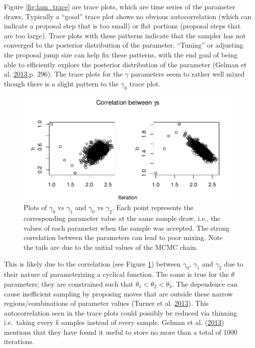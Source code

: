 \documentclass[11pt,a4paper]{article}
\numberwithin{equation}{section}
\begin{document}
Figure \ref{fig:lam_trace} are trace plots, which are time series of the
parameter draws. Typically a ``good'' trace plot shows no obvious
autocorrelation (which can indicate a proposal step that is too small)
or flat portions (proposal steps that are too large). Trace plots with
these patterns indicate that the sampler has not converged to the
posterior distribution of the parameter. ``Tuning'' or adjusting the
proposal jump size can help fix these patterns, with the end goal of
being able to efficiently explore the posterior distribution of the
parameter (Gelman et al.
\protect\hyperlink{ref-gelman_bayesian_2013}{2013},p. 296). The trace
plots for the \(\gamma\) parameters seem to rather well mixed though
there is a slight pattern to the \(\gamma_0\) trace plot.

\begin{figure}
\centering
\includegraphics{thesis_draft_files/figure-latex/unnamed-chunk-2-1.pdf}
\caption{\label{fig:cor_gammas}Plots of \(\gamma_0\) vs \(\gamma_1\) and
\(\gamma_0\) vs \(\gamma_2\). Each point represents the corresponding
parameter value at the same sample draw, i.e., the values of each
parameter when the sample was accepted. The strong correlation between
the parameters can lead to poor mixing. Note the tails are due to the
initial values of the MCMC chain.}
\end{figure}

This is likely due to the correlation (see Figure \ref{fig:cor_gammas})
between \(\gamma_0\), \(\gamma_1\) and \(\gamma_2\) due to their nature
of parameterizing a cyclical function. The same is true for the
\(\theta\) parameters; they are constrained such that
\(\theta_1 < \theta_2 < \theta_3\). The dependence can cause inefficient
sampling by proposing moves that are outside these narrow
regions/combinations of parameter values (Turner et al.
\protect\hyperlink{ref-turner_method_2013}{2013}). This autocorrelation
seen in the trace plots could possibly be reduced via thinning
i.e.~taking every \(k\) samples instead of every sample. Gelman et al.
(\protect\hyperlink{ref-gelman_bayesian_2013}{2013}) mentions that they
have found it useful to store no more than a total of \(1000\)
iterations.
\end{document}

